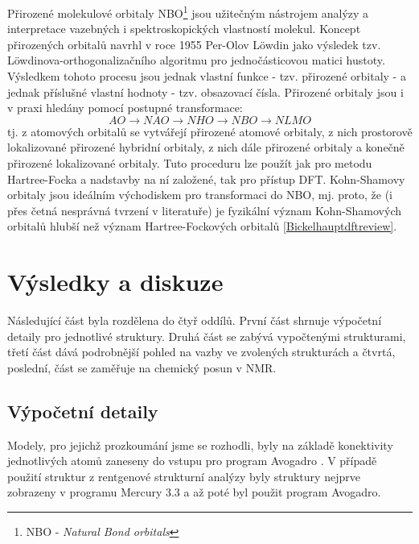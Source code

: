 \documentclass[
digital, %
table,   %
lof,     %
lot,     %
oneside,
]{fithesis3}
\begin{document}
Přirozené molekulové orbitaly NBO\footnote{NBO - \textit{Natural Bond orbitals}} jsou užitečným nástrojem analýzy a interpretace vazebných i spektroskopických vlastností molekul. Koncept přirozených orbitalů navrhl v roce 1955 Per-Olov Löwdin jako výsledek tzv. Löwdinova-orthogonalizačního algoritmu pro jednočásticovou matici hustoty. Výsledkem tohoto procesu jsou jednak vlastní funkce - tzv. přirozené orbitaly - a jednak příslušné vlastní hodnoty - tzv. obsazovací čísla. Přirozené orbitaly jsou i v praxi hledány pomocí postupné transformace:
\begin{displaymath}
AO \longrightarrow NAO \longrightarrow NHO \longrightarrow NBO \longrightarrow NLMO
\end{displaymath}
tj. z atomových orbitalů se vytvářejí přirozené atomové orbitaly, z nich prostorově lokalizované přirozené hybridní orbitaly, z nich dále přirozené orbitaly  a konečně přirozené lokalizované orbitaly. Tuto proceduru lze použít jak pro metodu Hartree-Focka a nadstavby na ní založené, tak pro přístup DFT. Kohn-Shamovy orbitaly jsou ideálním východiskem pro transformaci do NBO, mj. proto, že (i přes četná nesprávná tvrzení v literatuře) je fyzikální význam Kohn-Shamových orbitalů hlubší než význam Hartree-Fockových orbitalů \ref{Bickelhauptdftreview}.

\chapter{Výsledky a diskuze}
Následující část byla rozdělena do čtyř oddílů. První část shrnuje výpočetní detaily pro jednotlivé struktury. Druhá  část se zabývá vypočtenými strukturami, třetí část dává podrobnější pohled na vazby ve zvolených strukturách a čtvrtá, poslední, část se zaměřuje na chemický posun v NMR.

\section{Výpočetní detaily}
Modely, pro jejichž prozkoumání jsme se rozhodli, byly na základě konektivity jednotlivých atomů zaneseny do vstupu pro program Avogadro \cite{Avogadro}. V případě použití struktur z rentgenové strukturní analýzy byly struktury nejprve zobrazeny v programu Mercury 3.3 \cite{Mercury} a až poté byl použit program Avogadro.
\end{document}
